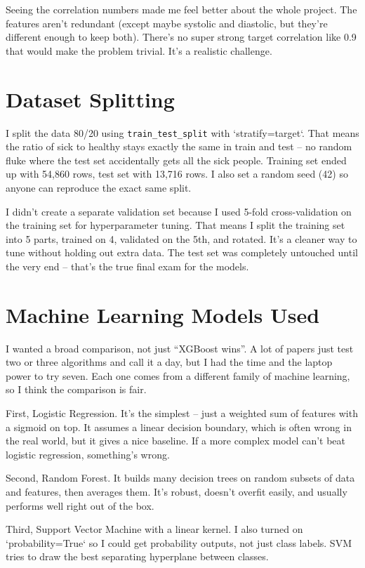 \documentclass[12pt, a4paper, oneside]{book}
\begin{document}
Seeing the correlation numbers made me feel better about the whole project. The features aren't redundant (except maybe systolic and diastolic, but they're different enough to keep both). There's no super strong target correlation like 0.9 that would make the problem trivial. It's a realistic challenge.

\section{Dataset Splitting}
I split the data 80/20 using \texttt{train\_test\_split} with `stratify=target`. That means the ratio of sick to healthy stays exactly the same in train and test -- no random fluke where the test set accidentally gets all the sick people. Training set ended up with 54,860 rows, test set with 13,716 rows. I also set a random seed (42) so anyone can reproduce the exact same split.

I didn't create a separate validation set because I used 5-fold cross-validation on the training set for hyperparameter tuning. That means I split the training set into 5 parts, trained on 4, validated on the 5th, and rotated. It's a cleaner way to tune without holding out extra data. The test set was completely untouched until the very end -- that's the true final exam for the models.

\section{Machine Learning Models Used}
I wanted a broad comparison, not just ``XGBoost wins''. A lot of papers just test two or three algorithms and call it a day, but I had the time and the laptop power to try seven. Each one comes from a different family of machine learning, so I think the comparison is fair.

First, Logistic Regression. It's the simplest -- just a weighted sum of features with a sigmoid on top. It assumes a linear decision boundary, which is often wrong in the real world, but it gives a nice baseline. If a more complex model can't beat logistic regression, something's wrong.

Second, Random Forest. It builds many decision trees on random subsets of data and features, then averages them. It's robust, doesn't overfit easily, and usually performs well right out of the box.

Third, Support Vector Machine with a linear kernel. I also turned on `probability=True` so I could get probability outputs, not just class labels. SVM tries to draw the best separating hyperplane between classes.
\end{document}
